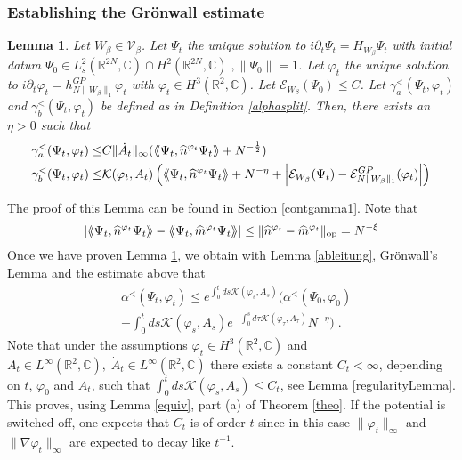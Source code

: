 \documentclass[11pt, english, american]{article}
\newcommand{\laa}{\langle\hspace{-0.08cm}\langle}
\newcommand{\raa}{\rangle\hspace{-0.08cm}\rangle}
\newtheorem{lemma}[theorem]{Lemma}
\renewcommand{\phi}{\varphi}
\begin{document}
\subsubsection{Establishing the Gr\"onwall estimate}\label{secest}
\begin{lemma} \label{gammalemma}
Let $W_\beta \in \mathcal{V}_\beta$.
Let $\Psi_t$ the unique solution to $i \partial_t \Psi_t
= H_{W_\beta} \Psi_t$ with initial datum 
$\Psi_0 \in L^2_{s}(\mathbb{R}^{2N}, \mathbb{C}) \cap H^2(\mathbb{R}^{2N}, \mathbb{C}) \;, \|\Psi_0\|=1$.  
Let $\phi_t$ the unique solution to $i \partial_t \phi_t
= h^{GP}_{N \|W_\beta\|_1} \phi_t$ with $\phi_t \in H^{3}(\mathbb{R}^2,\mathbb{C})$.
Let $\mathcal{E}_{W_\beta}(\Psi_0) \leq C$.
Let $\gamma^<_{a}(\Psi_t,\phi_t)$ and $\gamma^<_{b}(\Psi_t,\phi_t)$ be defined as in Definition \eqref{alphasplit}.
Then, there exists an $\eta>0$ such that
\begin{align} 
\label{abc}
\gamma_a^<(\Psi_t,\phi_t) \leq &
C \|\dot A_t\|_\infty ( \laa\Psi_t,\widehat{n}^{\phi_t}\Psi_t\raa + N^{-\frac{1}{2}} ) 
\\
\label{theoremeq1}
\gamma_b^<(\Psi_t,\phi_t) \leq &
\mathcal{K}(\phi_t, A_t)
\left(
 \laa\Psi_t,\widehat{n}^{\phi_t}\Psi_t\raa + N^{-\eta}+
\left|
\mathcal{E}_{W_\beta}(\Psi_t)
-
\mathcal{E}_{N \|W_\beta\|_1}^ {GP}(\phi_t)
\right|
 \right)
\end{align}
\end{lemma}
The proof of this Lemma can be found in Section \ref{contgamma1}.
Note that
$$| \laa\Psi_t,\widehat{n}^{\phi_t}\Psi_t\raa- \laa\Psi_t,\widehat{m}^{\phi_t}\Psi_t\raa|
\leq
\|\widehat{n}^{\phi_t}-\widehat{m}^{\phi_t}\|_{\text{op}}
=
N^{-\xi}
$$
Once we have proven Lemma \ref{gammalemma}, we obtain with Lemma \ref{ableitung}, Gr\"onwall's Lemma and the estimate above that
\begin{align*}
&\alpha^<(\Psi_t,\phi_t)\leq  
e^{
\int_0^t ds \mathcal{K}(\phi_s, A_s)}
\Big(
\alpha^<(\Psi_0,\phi_0)
\\
&+
\int_0^t ds
\mathcal{K}(\phi_s, A_s)
e^{-\int_0^s d \tau \mathcal{K}(\phi_\tau, A_\tau)}
 N^{-\eta}
 \Big) \;.
\end{align*}
Note that under the assumptions $\phi_t \in H^{3}(\mathbb{R}^2,\mathbb{C})$ and $
A_t \in L^\infty(\mathbb{R}^2, \mathbb{C}),\; \dot{A}_t \in L^\infty(\mathbb{R}^2, \mathbb{C})$
there exists a constant $C_t < \infty$, depending on $t$, $\phi_0$ and $A_t$, such that
 $\int_0^t ds
\mathcal{K}(\phi_s, A_s) \leq C_t$, see Lemma \ref{regularityLemma}.
This proves, using Lemma \ref{equiv},  part (a) of  Theorem \ref{theo}. 
If the potential is switched off, one expects that $C_t$ is of order $t$ since in this case $\|\phi_t\|_\infty$
and $\|\nabla \phi_t\|_\infty$ are expected to decay like $t^{-1}$.
\end{document}

